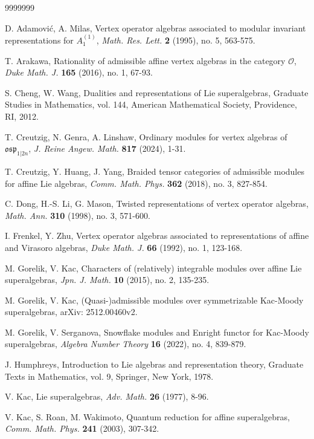 \documentclass[12pt]{article}
\begin{document}
\begin{thebibliography}{9999999}

D. Adamovi\'{c}, A. Milas,
Vertex operator algebras associated to modular invariant representations for $A_1^{(1)}$,
{\em Math. Res. Lett.} {\bf 2} (1995), no. 5, 563-575.


T. Arakawa,
Rationality of admissible affine vertex algebras in the category $\mathcal{O}$,
{\em Duke Math. J.} {\bf 165} (2016), no. 1, 67-93.

S. Cheng, W. Wang,
Dualities and representations of Lie superalgebras,
Graduate Studies in Mathematics, vol. 144, American Mathematical Society, Providence, RI, 2012.

T. Creutzig, N. Genra, A. Linshaw,
Ordinary modules for vertex algebras of $\mathfrak{osp}_{1|2n}$,
{\em J. Reine Angew. Math.} {\bf 817} (2024), 1-31.

T. Creutzig, Y. Huang, J. Yang,
Braided tensor categories of admissible modules for affine Lie algebras,
{\em Comm. Math. Phys.} {\bf 362} (2018), no. 3, 827-854.

C. Dong, H.-S. Li, G. Mason,
Twisted representations of vertex operator algebras,
{\em Math. Ann.} {\bf 310} (1998), no. 3, 571-600.

I. Frenkel, Y. Zhu,
Vertex operator algebras associated to representations of affine and Virasoro algebras,
{\em Duke Math. J.} {\bf 66} (1992), no. 1, 123-168.

M. Gorelik, V. Kac,
Characters of (relatively) integrable modules over affine Lie superalgebras,
{\em Jpn. J. Math.} {\bf 10} (2015), no. 2, 135-235.

M. Gorelik, V. Kac,
(Quasi-)admissible modules over symmetrizable Kac-Moody superalgebras,
arXiv: 2512.00460v2.

M. Gorelik, V. Serganova,
Snowflake modules and Enright functor for Kac-Moody superalgebras,
{\em Algebra Number Theory} {\bf 16} (2022), no. 4, 839-879.


J. Humphreys,
Introduction to Lie algebras and representation theory,
Graduate Texts in Mathematics, vol. 9, Springer, New York, 1978.


V. Kac, Lie superalgebras,
{\em Adv. Math.} {\bf 26} (1977), 8-96.

V. Kac, S. Roan, M. Wakimoto,
Quantum reduction for affine superalgebras,
{\em Comm. Math. Phys.} {\bf 241} (2003), 307-342.



\end{thebibliography}
\end{document}
